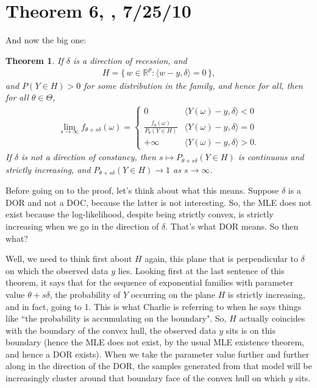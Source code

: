 \documentclass{amsbook}
\def\RR{{\mathbb R}}
\newcommand{\set}[1]{\{\,#1\,\}}
\newcommand{\inner}[1]{\langle #1 \rangle}
\newtheorem{theorem}{Theorem}
\theoremstyle{definition}
\theoremstyle{remark}
\begin{document}
\section{Theorem 6, \citet[p. 271]{Geyer:gdor}, 7/25/10}
And now the big one:
\begin{theorem}
If $\delta$ is a direction of recession, and
\begin{align*}
H = \set{ w \in \RR^p: \inner{w-y,\delta}=0 },
\end{align*}
and $P(Y \in H) > 0$ for some distribution in the family, and hence for all, then for 
all $\theta \in \Theta$,
\begin{align*}
\lim_{s \to \infty} f_{\theta+s\delta}(\omega) = 
			\begin{cases} 
			0 								& \inner{Y(\omega) - y ,\delta} < 0 \\
			\frac{f_\theta(\omega)}{P_\theta(Y \in H)} 	& \inner{Y(\omega) - y ,
\delta} = 0 \\
			+\infty							& \inner{Y(\omega) - y ,\delta} > 0.
		\end{cases}
\end{align*}
If $\delta$ is not a direction of constancy, then $s \mapsto P_{\theta+s\delta}( Y 
\in H)$ is continuous and strictly increasing, and $P_{\theta+s\delta}( Y \in H) \to 
1$ as $s \to \infty$.
\end{theorem}
Before going on to the proof, let's think about what this means.  Suppose $\delta$ is 
a DOR and not a DOC, because the latter is not interesting.  So, the MLE does not 
exist because the log-likelihood, despite being strictly convex, is strictly 
increasing when we go in the direction of $\delta$.  That's what DOR means.  So then 
what?

Well, we need to think first about $H$ again, this plane that is perpendicular to $
\delta$ on which the observed data $y$ lies.  Looking first at the last sentence of 
this theorem, it says that for the sequence of exponential families with parameter 
value $\theta+s\delta$, the probability of $Y$ occurring on the plane $H$ is strictly 
increasing, and in fact, going to 1.  This is what Charlie is referring to when he 
says things like ``the probability is accumulating on the boundary".  So, $H$ 
actually coincides with the boundary of the convex hull, the observed data $y$ sits 
is on this boundary (hence the MLE does not exist, by the usual MLE existence 
theorem, and hence a DOR exists).  When we take the parameter value further and 
further along in the direction of the DOR, the samples generated from that model will 
be increasingly cluster around that boundary face of the convex hull on which $y$ 
sits.
\end{document}
